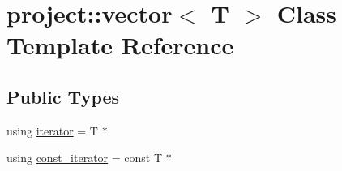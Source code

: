 \hypertarget{classproject_1_1vector}{}\section{project\+::vector$<$ T $>$ Class Template Reference}
\label{classproject_1_1vector}
\subsection*{Public Types}
\begin{DoxyCompactItemize}
\item 
using \mbox{\hyperlink{classproject_1_1vector_a429c6a5f47b0de55ac858b3be5aeda8b}{iterator}} = T $\ast$
\item 
using \mbox{\hyperlink{classproject_1_1vector_ab242a1c8c7abec9b305e502ff7cd0fb2}{const\+\_\+iterator}} = const T $\ast$
\end{DoxyCompactItemize}
